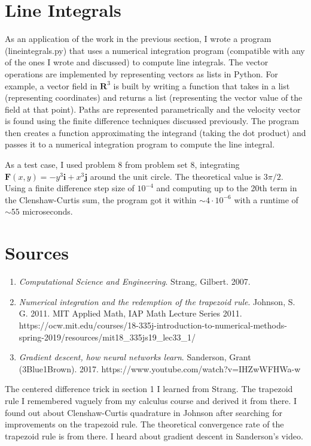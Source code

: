 \documentclass[11pt]{article}
\theoremstyle{plain}
\begin{document}
\section{Line Integrals}
As an application of the work in the previous section, I wrote a program (lineintegrals.py) that uses a numerical integration program (compatible with any of the ones I wrote and discussed) to compute line integrals. The vector operations are implemented by representing vectors as lists in Python. For example, a vector field in $\mathbf{R}^3$ is built by writing a function that takes in a list (representing coordinates) and returns a list (representing the vector value of the field at that point). Paths are represented parametrically and the velocity vector is found using the finite difference techniques discussed previously. The program then creates a function approximating the integrand (taking the dot product) and passes it to a numerical integration program to compute the line integral.
\par
As a test case, I used problem 8 from problem set 8, integrating $\mathbf{F}(x,y) = -y^3\mathbf{i}+x^3\mathbf{j}$ around the unit circle. The theoretical value is $3\pi/2$. Using a finite difference step size of $10^{-4}$ and computing up to the 20th term in the Clenshaw-Curtis sum, the program got it within $\sim 4\cdot10^{-6}$ with a runtime of $\sim 55$ microseconds.
\section{Sources}
\begin{enumerate}
	\item \emph{Computational Science and Engineering}. Strang, Gilbert. 2007.
	\item \emph{Numerical integration and the redemption of the trapezoid rule}. Johnson, S. G. 2011. MIT Applied Math, IAP Math Lecture Series 2011. https://ocw.mit.edu/courses/18-335j-introduction-to-numerical-methods-spring-2019/resources/mit18\_335js19\_lec33\_1/
	\item \emph{Gradient descent, how neural networks learn}. Sanderson, Grant (3Blue1Brown). 2017. https://www.youtube.com/watch?v=IHZwWFHWa-w
\end{enumerate}
The centered difference trick in section 1 I learned from Strang. The trapezoid rule I remembered vaguely from my calculus course and derived it from there. I found out about Clenshaw-Curtis quadrature in Johnson after searching for improvements on the trapezoid rule. The theoretical convergence rate of the trapezoid rule is from there. I heard about gradient descent in Sanderson's video.
\end{document}
